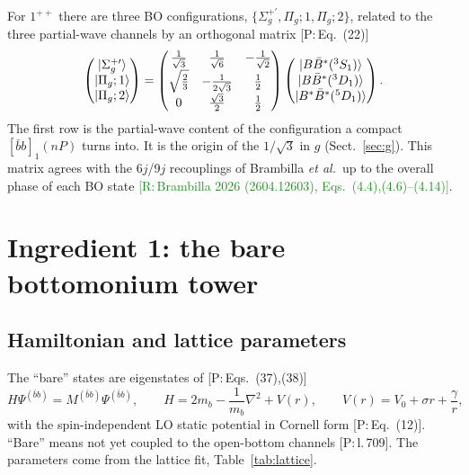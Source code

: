 \documentclass[11pt,a4paper]{article}
\newcommand{\tagP}[1]{\textcolor{blue!65!black}{\textsf{\small[P:\,#1]}}}
\newcommand{\tagR}[1]{\textcolor{ForestGreen}{\textsf{\small[R:\,#1]}}}
\newcommand{\BBst}{B\bar B^*}
\newcommand{\BstBst}{B^*\bar B^*}
\newcommand{\bbnP}{[\bar bb]_1(nP)}
\begin{document}
For $1^{++}$ there are three BO configurations, $\{\Sigma_g^{+\prime},\Pi_g;1,\Pi_g;2\}$, related to the three partial-wave channels by an orthogonal matrix \tagP{Eq.~(22)}
\begin{equation}
\begin{pmatrix}\ket{\Sigma_g^{+\prime}}\\ \ket{\Pi_g;1}\\ \ket{\Pi_g;2}\end{pmatrix}
=\begin{pmatrix}\frac{1}{\sqrt3}&\frac{1}{\sqrt6}&-\frac{1}{\sqrt2}\\[1mm] \sqrt{\frac23}&-\frac{1}{2\sqrt3}&\frac12\\[1mm] 0&\frac{\sqrt3}{2}&\frac12\end{pmatrix}
\begin{pmatrix}\ket{\BBst(^3S_1)}\\ \ket{\BBst(^3D_1)}\\ \ket{\BstBst(^5D_1)}\end{pmatrix}.
\label{eq:BOmatrix}
\end{equation}
The first row is the partial-wave content of the configuration a compact $\bbnP$ turns into. It is the origin of the $1/\sqrt3$ in $g$ (Sect.~\ref{sec:g}). This matrix agrees with the 6$j$/9$j$ recouplings of Brambilla \emph{et al.}\ up to the overall phase of each BO state \tagR{Brambilla 2026 (2604.12603), Eqs.~(4.4),(4.6)--(4.14)}.

\section{Ingredient 1: the bare bottomonium tower}
\label{sec:tower}

\subsection{Hamiltonian and lattice parameters}

The ``bare'' states are eigenstates of \tagP{Eqs.~(37),(38)}
\begin{equation}
H\Psi^{(\bar bb)}=M^{(\bar bb)}\Psi^{(\bar bb)},\qquad H=2m_b-\frac{1}{m_b}\nabla^2+V(r),\qquad V(r)=V_0+\sigma r+\frac{\gamma}{r},
\end{equation}
with the spin-independent LO static potential in Cornell form \tagP{Eq.~(12)}. ``Bare'' means not yet coupled to the open-bottom channels \tagP{l.\,709}. The parameters come from the lattice fit, Table~\ref{tab:lattice}.
\end{document}
